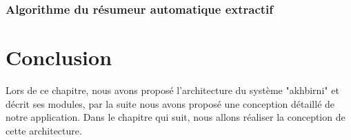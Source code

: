 
\subsubsection{Algorithme du résumeur automatique extractif}



\section{Conclusion}
Lors de ce chapitre, nous avons proposé l'architecture du système "akhbirni" et décrit ses modules, par la suite nous avons proposé une conception détaillé de notre application. Dans le chapitre qui suit, nous allons réaliser la conception de cette architecture.